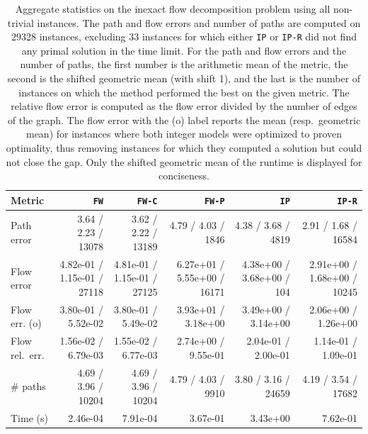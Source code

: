 \documentclass{ecai}
\begin{document}
\setlength{\tabcolsep}{4pt}
\begin{table}
\centering
\caption{Aggregate statistics on the inexact flow decomposition problem using all non-trivial instances.
The path and flow errors and number of paths are computed on 29328 instances, excluding 33 instances for which either \texttt{IP} or \texttt{IP-R} did not find any primal solution in the time limit.
For the path and flow errors and the number of paths, the first number is the arithmetic mean of the metric, the second is the shifted geometric mean (with shift 1), and the last is the number of instances on which the method performed the best on the given metric.
The relative flow error is computed as the flow error divided by the number of edges of the graph.
The flow error with the (o) label reports the mean (resp.~geometric mean) for instances where both integer models were optimized to proven optimality, thus removing instances for which they computed a solution but could not close the gap.
Only the shifted geometric mean of the runtime is displayed for conciseness.
\vspace*{0.2cm}
}
\begin{tabular}{lrrrrr}
\toprule
Metric & \texttt{FW} & \texttt{FW-C} & \texttt{FW-P} & \texttt{IP} & \texttt{IP-R} \\
\midrule
Path error &  3.64 / 2.23 / 13078  &  3.62 / 2.22 / 13189  &  4.79 / 4.03 / 1846  &  4.38 / 3.68 / 4819  &  2.91 / 1.68 / 16584  \\
Flow error &  4.82e-01 / 1.15e-01 / 27118  &  4.81e-01 / 1.15e-01 / 27125  &  6.27e+01 / 5.55e+00 / 16171  &  4.38e+00 / 3.68e+00 / 104  &  2.91e+00 / 1.68e+00 / 10245  \\
Flow err. (o) &  3.80e-01 / 5.52e-02  &  3.80e-01 / 5.49e-02  &  3.93e+01 / 3.18e+00  &  3.49e+00 / 3.14e+00  &  2.06e+00 / 1.26e+00  \\
Flow rel.~err. &  1.56e-02 / 6.79e-03  &  1.55e-02 / 6.77e-03  &  2.74e+00 / 9.55e-01  &  2.04e-01 / 2.00e-01  &  1.14e-01 / 1.09e-01  \\
\# paths &  4.69 / 3.96 / 10204  &  4.69 / 3.96 / 10204  &  4.79 / 4.03 / 9910  &  3.80 / 3.16 / 24659  &  4.19 / 3.54 / 17682  \\
Time (s) &  2.46e-04  &  7.91e-04  &  3.67e-01  &  3.43e+00  &  7.62e-01  \\
\bottomrule
\end{tabular}
\label{tab:gtstats}
\end{table}
\end{document}
